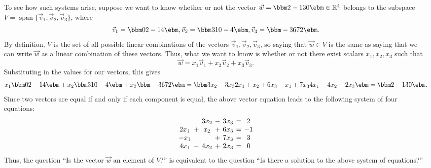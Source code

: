 To see how such systems arise, suppose we want to know whether or not the vector $\vec w = \bbm 2\\-1\\3\\0\ebm \in\mathbb{R}^4$ belongs to the subspace $V = \operatorname{span}\{\vec{v}_1, \vec{v}_2, \vec{v}_3\}$, where
\[
\vec{v}_1 = \bbm 0\\2\\-1\\4\ebm, \vec{v}_2 = \bbm 3\\1\\0\\-4\ebm, \vec{v}_3 = \bbm -3\\6\\7\\2\ebm.
\]
By definition, $V$ is the set of all possible linear combinations of the vectors $\vec{v}_1, \vec{v}_2, \vec{v}_3$, so saying that $\vec w \in V$ is the same as saying that we can write $\vec w$ as a linear combination of these vectors. Thus, what we want to know is whether or not there exist scalars $x_1, x_2, x_3$ such that
\[
\vec w = x_1\vec{v}_1 + x_2\vec{v}_2 + x_3\vec{v}_3.
\]
Substituting in the values for our vectors, this gives
\[
x_1\bbm 0\\2\\-1\\4\ebm + x_2\bbm 3\\1\\0\\-4\ebm + x_3\bbm -3\\6\\7\\2\ebm  = \bbm 3x_2-3x_3\\2x_1+x_2+6x_3\\-x_1+7x_3\\4x_1-4x_2+2x_3\ebm = \bbm 2\\-1\\3\\0\ebm .
\]
Since two vectors are equal if and only if each component is equal, the above vector equation leads to the following system of four equations:
\[\arraycolsep=2pt
\begin{array}{ccccccc}
 & &3x_2&-&3x_3&=&2\\
2x_1&+&x_2&+&6x_3&=&-1\\
-x_1& & &+&7x_3&=&3\\
4x_1&-&4x_2&+&2x_3&=&0
\end{array}
\]
Thus, the question ``Is the vector $\vec w$ an element of $V$?'' is equivalent to the question ``Is there a solution to the above system of equations?'' 

